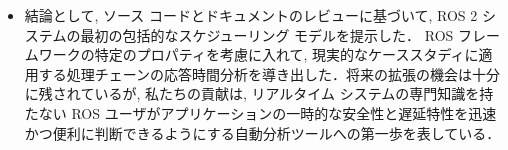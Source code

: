 \begin{frame}{}
    \begin{itemize}
        \item 結論として, ソース コードとドキュメントのレビューに基づいて, ROS 2 システムの最初の包括的なスケジューリング モデルを提示した． ROS フレームワークの特定のプロパティを考慮に入れて, 現実的なケーススタディに適用する処理チェーンの応答時間分析を導き出した．将来の拡張の機会は十分に残されているが, 私たちの貢献は, リアルタイム システムの専門知識を持たない ROS ユーザがアプリケーションの一時的な安全性と遅延特性を迅速かつ便利に判断できるようにする自動分析ツールへの第一歩を表している．
    \end{itemize}
\end{frame}
